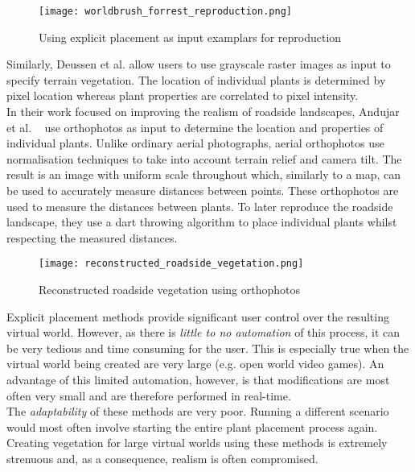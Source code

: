 \begin{figure}[h]
  \centering
	\texttt{[image: worldbrush\_forrest\_reproduction.png]}
	\caption{Using explicit placement as input examplars for reproduction \cite{Emilien}}
	\label{fig:explicit_placement_input_examplars}
\end{figure}

Similarly, Deussen et al. \cite{Deussen1998} allow users to use grayscale raster images as input to specify terrain vegetation. The location of individual plants is determined by pixel location whereas plant properties are correlated to pixel intensity.\\

In their work focused on improving the realism of roadside landscapes, Andujar et al. ~\cite{Andujar2014} use orthophotos as input to determine the location and properties of individual plants. Unlike ordinary aerial photographs, aerial orthophotos use normalisation techniques to take into account terrain relief and camera tilt. The result is an image with uniform scale throughout which, similarly to a map, can be used to accurately measure distances between points. These orthophotos are used to measure the distances between plants. To later reproduce the roadside landscape, they use a dart throwing algorithm to place individual plants whilst respecting the measured distances. \\

\begin{figure}[!htb]
  \centering
	\label{Reconstructed roadside vegetation using orthophotos}
	\texttt{[image: reconstructed\_roadside\_vegetation.png]}
	\caption{Reconstructed roadside vegetation using orthophotos ~\cite{Andujar2014}}
\end{figure}

Explicit placement methods provide significant user control over the resulting virtual world. However, as there is \textit{little to no automation} of this process, it can be very tedious and time consuming for the user. This is especially true when the virtual world being created are very large (e.g. open world video games). An advantage of this limited automation, however, is that modifications are most often very small and are therefore performed in real-time. \\
The \textit{adaptability} of these methods are very poor. Running a different scenario would most often involve starting the entire plant placement process again. \\
Creating vegetation for large virtual worlds using these methods is extremely strenuous and, as a consequence, realism is often compromised.

